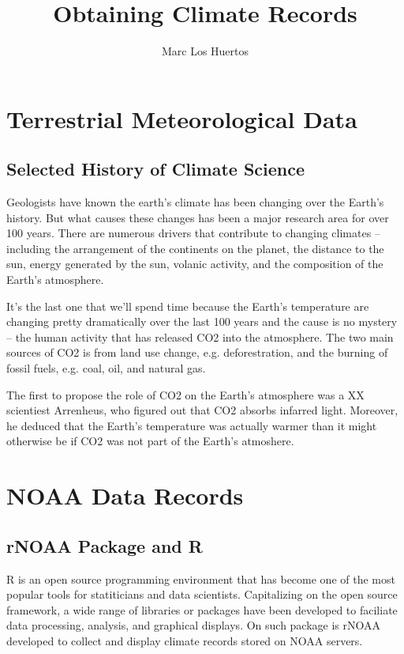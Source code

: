 \documentclass{article}\usepackage[]{graphicx}\usepackage[]{color}
\title{Obtaining Climate Records}
\author{Marc Los Huertos}
\begin{document}
\maketitle

\section{Terrestrial Meteorological Data}

\subsection{Selected History of Climate Science}

Geologists have known the earth's climate has been changing over the Earth's history. But what causes these changes has been a major research area for over 100 years. There are numerous drivers that contribute to changing climates -- including the arrangement of the continents on the planet, the distance to the sun, energy generated by the sun, volanic activity, and the composition of the Earth's atmosphere. 

It's the last one that we'll spend time because the Earth's temperature are changing pretty dramatically over the last 100 years and the cause is no mystery -- the human activity that has released CO2 into the atmosphere. The two main sources of CO2 is from land use change, e.g. deforestration, and the burning of fossil fuels, e.g. coal, oil, and natural gas. 

The first to propose the role of CO2 on the Earth's atmosphere was a XX scientiest Arrenheus, who figured out that CO2 absorbs infarred light. Moreover, he deduced that the Earth's temperature was actually warmer than it might otherwise be if CO2 was not part of the Earth's atmoshere. 


\section{NOAA Data Records}


\subsection{rNOAA Package and R}

R is an open source programming environment that has become one of the most popular tools for statiticians and data scientists. Capitalizing on the open source framework, a wide range of libraries or packages have been developed to faciliate data processing, analysis, and graphical displays. On such package is rNOAA developed to collect and display climate records stored on NOAA servers.
\end{document}
